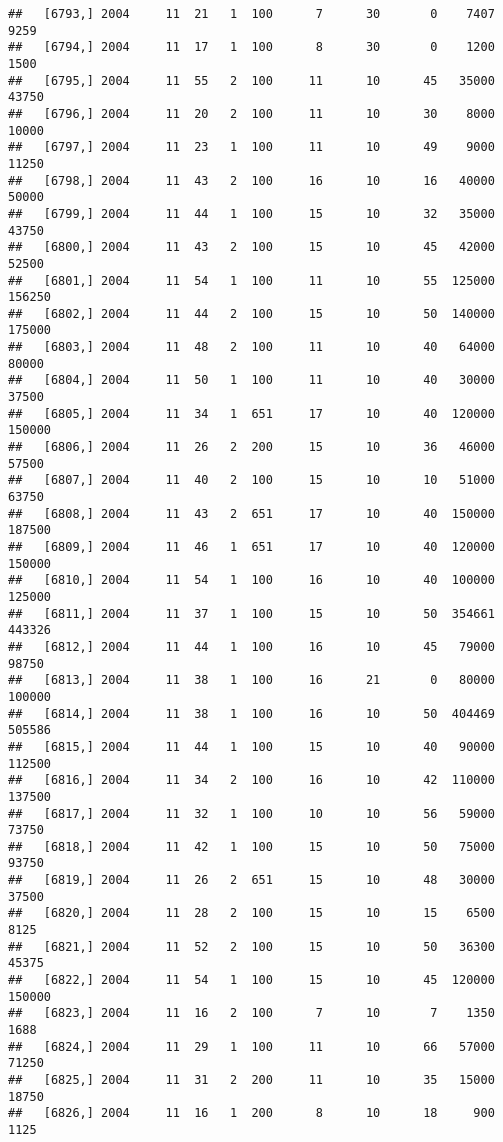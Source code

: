 \documentclass{article}\usepackage[]{graphicx}\usepackage[]{color}
\makeatletter
\newenvironment{kframe}{%
 \def\at@end@of@kframe{}%
 \ifinner\ifhmode%
  \def\at@end@of@kframe{\end{minipage}}%
  \begin{minipage}{\columnwidth}%
 \fi\fi%
 \def\FrameCommand##1{\hskip\@totalleftmargin \hskip-\fboxsep
 \colorbox{shadecolor}{##1}\hskip-\fboxsep
     \hskip-\linewidth \hskip-\@totalleftmargin \hskip\columnwidth}%
 \MakeFramed {\advance\hsize-\width
   \@totalleftmargin\z@ \linewidth\hsize
   \@setminipage}}%
 {\par\unskip\endMakeFramed%
 \at@end@of@kframe}
\newenvironment{knitrout}{}{} %
\makeatother
\begin{document}
\begin{knitrout}
\begin{kframe}
\begin{verbatim}
##   [6793,] 2004     11  21   1  100      7      30       0    7407    9259
##   [6794,] 2004     11  17   1  100      8      30       0    1200    1500
##   [6795,] 2004     11  55   2  100     11      10      45   35000   43750
##   [6796,] 2004     11  20   2  100     11      10      30    8000   10000
##   [6797,] 2004     11  23   1  100     11      10      49    9000   11250
##   [6798,] 2004     11  43   2  100     16      10      16   40000   50000
##   [6799,] 2004     11  44   1  100     15      10      32   35000   43750
##   [6800,] 2004     11  43   2  100     15      10      45   42000   52500
##   [6801,] 2004     11  54   1  100     11      10      55  125000  156250
##   [6802,] 2004     11  44   2  100     15      10      50  140000  175000
##   [6803,] 2004     11  48   2  100     11      10      40   64000   80000
##   [6804,] 2004     11  50   1  100     11      10      40   30000   37500
##   [6805,] 2004     11  34   1  651     17      10      40  120000  150000
##   [6806,] 2004     11  26   2  200     15      10      36   46000   57500
##   [6807,] 2004     11  40   2  100     15      10      10   51000   63750
##   [6808,] 2004     11  43   2  651     17      10      40  150000  187500
##   [6809,] 2004     11  46   1  651     17      10      40  120000  150000
##   [6810,] 2004     11  54   1  100     16      10      40  100000  125000
##   [6811,] 2004     11  37   1  100     15      10      50  354661  443326
##   [6812,] 2004     11  44   1  100     16      10      45   79000   98750
##   [6813,] 2004     11  38   1  100     16      21       0   80000  100000
##   [6814,] 2004     11  38   1  100     16      10      50  404469  505586
##   [6815,] 2004     11  44   1  100     15      10      40   90000  112500
##   [6816,] 2004     11  34   2  100     16      10      42  110000  137500
##   [6817,] 2004     11  32   1  100     10      10      56   59000   73750
##   [6818,] 2004     11  42   1  100     15      10      50   75000   93750
##   [6819,] 2004     11  26   2  651     15      10      48   30000   37500
##   [6820,] 2004     11  28   2  100     15      10      15    6500    8125
##   [6821,] 2004     11  52   2  100     15      10      50   36300   45375
##   [6822,] 2004     11  54   1  100     15      10      45  120000  150000
##   [6823,] 2004     11  16   2  100      7      10       7    1350    1688
##   [6824,] 2004     11  29   1  100     11      10      66   57000   71250
##   [6825,] 2004     11  31   2  200     11      10      35   15000   18750
##   [6826,] 2004     11  16   1  200      8      10      18     900    1125

\end{verbatim}
\end{kframe}
\end{knitrout}
\end{document}
